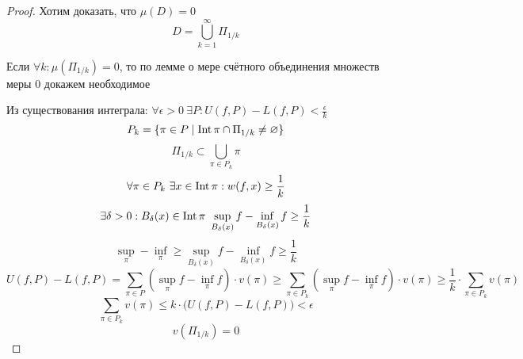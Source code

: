\begin{proof}
        \par Хотим доказать, что $\mu(D) = 0$
        $$D = \bigcup\limits_{k=1}^{\infty} \Pi_{1/k}$$
        \par Если $\forall k: \mu(\Pi_{1/k}) = 0$, то по лемме о мере счётного объединения множеств меры 0 докажем необходимое
        \bigskip
        \par Из существования интеграла: $\forall \epsilon>0 \ \exists P: U(f, P) - L(f, P) < \frac{\epsilon}{k}$
        $$P_k = \{\pi \in P \mid \operatorname{Int} \pi \cap \Pi_{1/k} \not = \varnothing \}$$
        $$\Pi_{1/k} \subset \bigcup\limits_{\pi \in P_k} \pi$$
        $$\forall \pi \in P_k \ \exists x \in \operatorname{Int} \pi: w(f, x) \ge \frac{1}{k}$$
        $$\exists \delta > 0: B_{\delta}(x) \in \operatorname{Int}  \pi \ \sup_{B_{\delta}(x)} f - \inf_{B_{\delta}(x)} f \ge \frac{1}{k}$$
        $$\sup_{\pi} - \inf_{\pi} \ge \sup_{B_{\delta}(x)} f - \inf_{B_{\delta}(x)} f \ge\frac{1}{k}$$
        \bigskip
        $$U(f, P) - L(f, P) = \sum\limits_{\pi \in P} (\sup_{\pi} f - \inf_{\pi} f) \cdot v(\pi) \ge \sum\limits_{\pi \in P_k} (\sup_{\pi} f - \inf_{\pi} f) \cdot v(\pi) \ge \frac{1}{k} \cdot \sum\limits_{\pi \in P_k} v(\pi)$$
        $$\sum\limits_{\pi \in P_k} v(\pi) \le k \cdot \big(U(f, P) - L(f, P)\big) < \epsilon$$
        \bigskip
        $$v(\Pi_{1/k}) = 0$$ 



    \end{proof}


